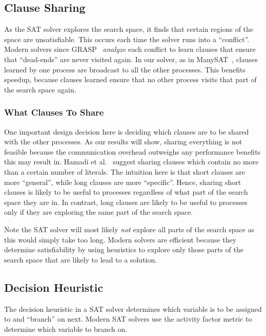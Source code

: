 \documentclass[letterpaper, compsoc, conference]{IEEEtran}
\begin{document}
\subsection{Clause Sharing}

As the SAT solver explores the search space, it finds that certain regions of
the space are unsatisfiable. This occurs each time the solver runs into a
``conflict''. Modern solvers since GRASP~\cite{Silva1997GRASP} \emph{analyze} each
conflict to learn clauses that ensure that ``dead-ends'' are never visited
again. In our solver, as in ManySAT~\cite{ManySAT}, clauses learned by one
process are broadcast to all the other processes. This benefits speedup,
because clauses learned ensure that no other process visits that part 
of the search space again.

\subsubsection{What Clauses To Share}

One important design decision here is deciding which clauses are to be shared
with the other processes. As our results will show, sharing everything is not
feasible because the communication overhead outweighs any performance benefits
this may result in. Hamadi et al.~\cite{Hamadi} suggest sharing clauses which
contain no more than a certain number of literals. The intuition here is that
short clauses are more ``general'', while long clauses are more ``specific''.
Hence, sharing short clauses is likely to be useful to processes regardless of
what part of the search space they are in. In contrast, long clauses are likely
to be useful to processes only if they are exploring the same part of the
search space. 

Note the SAT solver will most likely \textit{not} explore all parts of the
search space as this would simply take too long. Modern solvers are efficient
because they determine satisfiability by using heuristics to explore only
those parts of the search space that are likely to lead to a solution.

\subsection{Decision Heuristic} 
\label{sec:decheu}

The decision heuristic in a SAT solver determines which variable is to be
assigned to and ``branch'' on next. Modern SAT solvers use the activity factor
metric to determine which variable to branch on.
\end{document}
